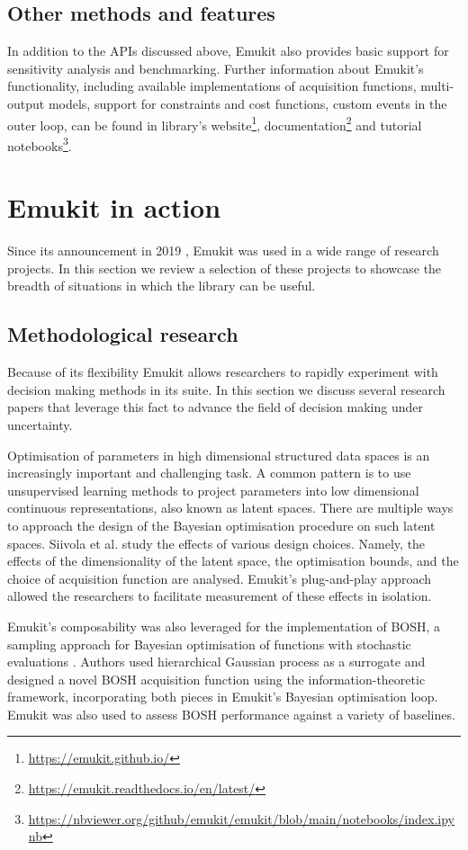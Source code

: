 \subsection{Other methods and features}
In addition to the APIs discussed above, Emukit also provides basic support for sensitivity analysis and benchmarking. Further information about Emukit's functionality, including available implementations of acquisition functions, multi-output models, support for constraints and cost functions, custom events in the outer loop, can be found in library's website\footnote{\url{https://emukit.github.io/}}, documentation\footnote{\url{https://emukit.readthedocs.io/en/latest/}} and tutorial notebooks\footnote{\url{https://nbviewer.org/github/emukit/emukit/blob/main/notebooks/index.ipynb}}. 

\section{Emukit in action}
Since its announcement in 2019 \cite{paleyes2019emulation}, Emukit was used in a wide range of research projects. In this section we review a selection of these projects to showcase the breadth of situations in which the library can be useful.

\subsection{Methodological research}
Because of its flexibility Emukit allows researchers to rapidly experiment with decision making methods in its suite. In this section we discuss several research papers that leverage this fact to advance the field of decision making under uncertainty.

Optimisation of parameters in high dimensional structured data spaces is an increasingly important and challenging task. A common pattern is to use unsupervised learning methods to project parameters into low dimensional continuous representations, also known as latent spaces. There are multiple ways to approach the design of the Bayesian optimisation procedure on such latent spaces. Siivola et al. \cite{siivola2021good} study the effects of various design choices. Namely, the effects of the dimensionality of the latent space, the optimisation bounds, and the choice of acquisition function are analysed. Emukit's plug-and-play approach allowed the researchers to facilitate measurement of these effects in isolation.

Emukit's composability was also leveraged for the implementation of BOSH, a sampling approach for Bayesian optimisation of functions with stochastic evaluations \cite{moss2020bosh}. Authors used hierarchical Gaussian process as a surrogate and designed a novel BOSH acquisition function using the information-theoretic framework, incorporating both pieces in Emukit's Bayesian optimisation loop. Emukit was also used to assess BOSH performance against a variety of baselines.

